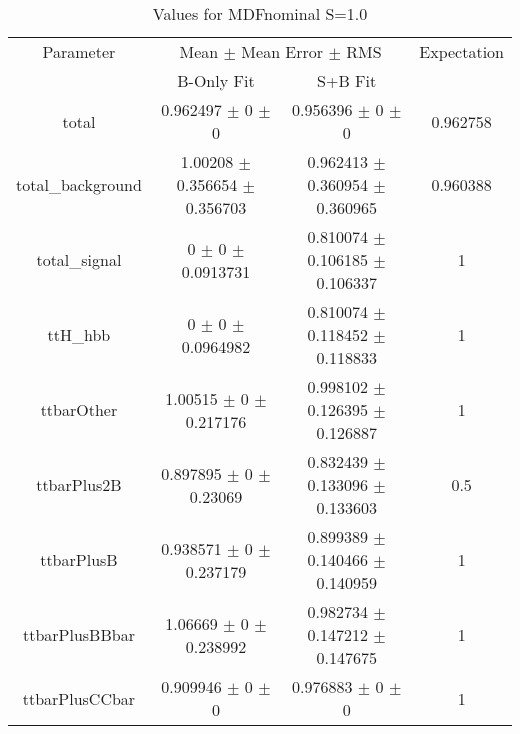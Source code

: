 \begin{table}
\centering
\caption{Values for MDFnominal S=1.0}
\begin{tabular}{cccc}
\toprule
Parameter & \multicolumn{2}{c}{Mean $\pm$ Mean Error $\pm$ RMS} & Expectation\\
 & B-Only Fit & S+B Fit & \\
\midrule
total & \num{0.962497} $\pm$ \num{0} $\pm$ \num{0} & \num{0.956396} $\pm$ \num{0} $\pm$ \num{0} & \num{0.962758}\\
total\_background & \num{1.00208} $\pm$ \num{0.356654} $\pm$ \num{0.356703} & \num{0.962413} $\pm$ \num{0.360954} $\pm$ \num{0.360965} & \num{0.960388}\\
total\_signal & \num{0} $\pm$ \num{0} $\pm$ \num{0.0913731} & \num{0.810074} $\pm$ \num{0.106185} $\pm$ \num{0.106337} & \num{1}\\
ttH\_hbb & \num{0} $\pm$ \num{0} $\pm$ \num{0.0964982} & \num{0.810074} $\pm$ \num{0.118452} $\pm$ \num{0.118833} & \num{1}\\
ttbarOther & \num{1.00515} $\pm$ \num{0} $\pm$ \num{0.217176} & \num{0.998102} $\pm$ \num{0.126395} $\pm$ \num{0.126887} & \num{1}\\
ttbarPlus2B & \num{0.897895} $\pm$ \num{0} $\pm$ \num{0.23069} & \num{0.832439} $\pm$ \num{0.133096} $\pm$ \num{0.133603} & \num{0.5}\\
ttbarPlusB & \num{0.938571} $\pm$ \num{0} $\pm$ \num{0.237179} & \num{0.899389} $\pm$ \num{0.140466} $\pm$ \num{0.140959} & \num{1}\\
ttbarPlusBBbar & \num{1.06669} $\pm$ \num{0} $\pm$ \num{0.238992} & \num{0.982734} $\pm$ \num{0.147212} $\pm$ \num{0.147675} & \num{1}\\
ttbarPlusCCbar & \num{0.909946} $\pm$ \num{0} $\pm$ \num{0} & \num{0.976883} $\pm$ \num{0} $\pm$ \num{0} & \num{1}\\
\bottomrule
\end{tabular}
\end{table}